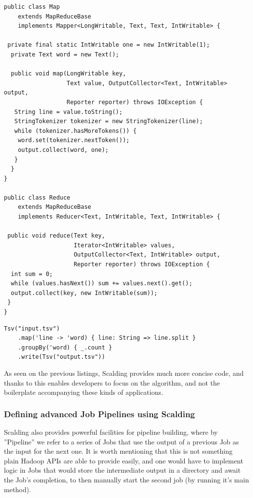 \begin{lstlisting}[caption={Word Count example Job, implemented using plain Java Map Reduce API}, label={lst:hadoop-mr}]
public class Map 
    extends MapReduceBase 
    implements Mapper<LongWritable, Text, Text, IntWritable> {

 private final static IntWritable one = new IntWritable(1);
  private Text word = new Text();

  public void map(LongWritable key, 
                  Text value, OutputCollector<Text, IntWritable> output, 
                  Reporter reporter) throws IOException {
   String line = value.toString();
   StringTokenizer tokenizer = new StringTokenizer(line);
   while (tokenizer.hasMoreTokens()) {
    word.set(tokenizer.nextToken());
    output.collect(word, one);
   }
  }
}

public class Reduce 
    extends MapReduceBase 
    implements Reducer<Text, IntWritable, Text, IntWritable> {

 public void reduce(Text key, 
                    Iterator<IntWritable> values, 
                    OutputCollector<Text, IntWritable> output, 
                    Reporter reporter) throws IOException {
  int sum = 0;
  while (values.hasNext()) sum += values.next().get();
  output.collect(key, new IntWritable(sum));
 }
}
\end{lstlisting}


\begin{lstlisting}[caption={Simplest Scalding job used in Oculus -- each frame perceptual hashing}, label={lst:simplest-scalding-job}]
  Tsv("input.tsv")
    .map('line -> 'word) { line: String => line.split }
    .groupBy('word) { _.count }
    .write(Tsv("output.tsv"))
\end{lstlisting}

As seen on the previous listings, Scalding provides much more concise code, and thanks to this enables developers to focus on the algorithm, and not the boilerplate accompanying these kinds of applications.

\subsubsection{Defining advanced Job Pipelines using Scalding}
\label{sec:defining-pipelines-basics}
Scalding also provides powerful facilities for pipeline building, where by ''Pipeline'' we refer to a series of Jobs that use the output of a previous Job as the input for the next one. It is worth mentioning that this is not something plain Hadoop APIs are able to provide easily, and one would have to implement logic in Jobs that would store the intermediate output in a directory and await the Job's completion, to then manually start the second job (by running it's main method).

